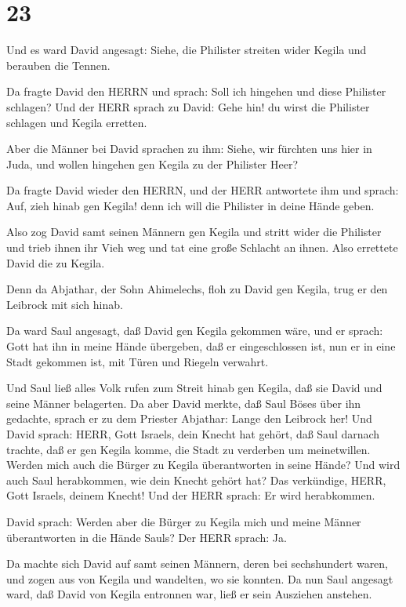 \hypertarget{section-22}{%
\section{23}\label{section-22}}

 Und es ward David angesagt: Siehe, die Philister streiten
wider Kegila und berauben die Tennen.

 Da fragte David den HERRN und sprach: Soll ich hingehen und
diese Philister schlagen? Und der HERR sprach zu David: Gehe hin! du
wirst die Philister schlagen und Kegila erretten.

 Aber die Männer bei David sprachen zu ihm: Siehe, wir
fürchten uns hier in Juda, und wollen hingehen gen Kegila zu der
Philister Heer?

 Da fragte David wieder den HERRN, und der HERR antwortete
ihm und sprach: Auf, zieh hinab gen Kegila! denn ich will die Philister
in deine Hände geben.

 Also zog David samt seinen Männern gen Kegila und stritt
wider die Philister und trieb ihnen ihr Vieh weg und tat eine große
Schlacht an ihnen. Also errettete David die zu Kegila.

 Denn da Abjathar, der Sohn Ahimelechs, floh zu David gen
Kegila, trug er den Leibrock mit sich hinab.

 Da ward Saul angesagt, daß David gen Kegila gekommen wäre,
und er sprach: Gott hat ihn in meine Hände übergeben, daß er
eingeschlossen ist, nun er in eine Stadt gekommen ist, mit Türen und
Riegeln verwahrt.

 Und Saul ließ alles Volk rufen zum Streit hinab gen Kegila,
daß sie David und seine Männer belagerten.  Da aber David
merkte, daß Saul Böses über ihn gedachte, sprach er zu dem Priester
Abjathar: Lange den Leibrock her!  Und David sprach: HERR,
Gott Israels, dein Knecht hat gehört, daß Saul darnach trachte, daß er
gen Kegila komme, die Stadt zu verderben um meinetwillen. 
Werden mich auch die Bürger zu Kegila überantworten in seine Hände? Und
wird auch Saul herabkommen, wie dein Knecht gehört hat? Das verkündige,
HERR, Gott Israels, deinem Knecht! Und der HERR sprach: Er wird
herabkommen.

 David sprach: Werden aber die Bürger zu Kegila mich und
meine Männer überantworten in die Hände Sauls? Der HERR sprach: Ja.

 Da machte sich David auf samt seinen Männern, deren bei
sechshundert waren, und zogen aus von Kegila und wandelten, wo sie
konnten. Da nun Saul angesagt ward, daß David von Kegila entronnen war,
ließ er sein Ausziehen anstehen.

